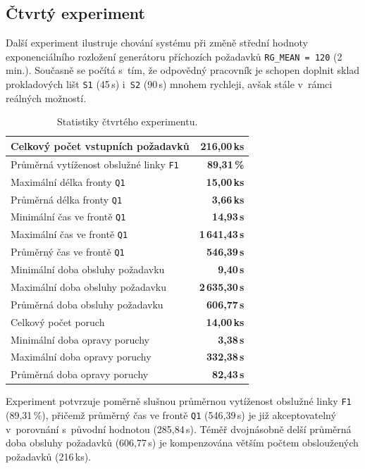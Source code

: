 \documentclass[a4paper, 11pt]{article}
\begin{document}
\subsection{Čtvrtý experiment}

Další experiment ilustruje chování systému při změně střední hodnoty exponenciálního rozložení generátoru příchozích požadavků \texttt{RG\_MEAN = 120} (2\,min.).
Současně se počítá s~tím, že odpovědný pracovník je schopen doplnit sklad prokladových lišt \texttt{S1} (45\,s) i~\texttt{S2} (90\,s) mnohem rychleji, avšak stále v~rámci reálných možností.

\begin{table}[ht!]
    \centering
    \begin{tabular}{|l|r|}
        \hline
        Celkový počet vstupních požadavků & \textbf{216,00\,ks} \\ \hline
        Průměrná vytíženost obslužné linky \texttt{F1} & \textbf{89,31\,\%} \\ \hline
        Maximální délka fronty \texttt{Q1} & \textbf{15,00\,ks} \\ \hline
        Průměrná délka fronty \texttt{Q1} & \textbf{3,66\,ks} \\ \hline
        Minimální čas ve frontě \texttt{Q1} & \textbf{14,93\,s} \\ \hline
        Maximální čas ve frontě \texttt{Q1} & \textbf{1\,641,43\,s} \\ \hline
        Průměrný čas ve frontě \texttt{Q1} & \textbf{546,39\,s} \\ \hline
        Minimální doba obsluhy požadavku & \textbf{9,40\,s} \\ \hline
        Maximální doba obsluhy požadavku & \textbf{2\,635,30\,s} \\ \hline
        Průměrná doba obsluhy požadavku & \textbf{606,77\,s} \\ \hline
        Celkový počet poruch & \textbf{14,00\,ks} \\ \hline
        Minimální doba opravy poruchy & \textbf{3,38\,s} \\ \hline
        Maximální doba opravy poruchy & \textbf{332,38\,s} \\ \hline
        Průměrná doba opravy poruchy & \textbf{82,43\,s} \\ \hline
    \end{tabular}
    \caption{Statistiky čtvrtého experimentu.}
\end{table}

Experiment potvrzuje poměrně slušnou průměrnou vytíženost obslužné linky \texttt{F1} (89,31\,\%), přičemž průměrný čas ve frontě \texttt{Q1} (546,39\,s) je již akceptovatelný v~porovnání s~původní hodnotou (285,84\,s).
Téměř dvojnásobně delší průměrná doba obsluhy požadavků (606,77\,s) je kompenzována větším počtem obsloužených požadavků (216\,ks).
\end{document}
